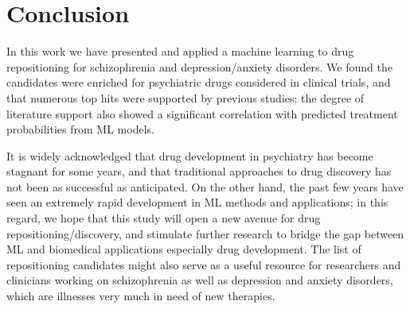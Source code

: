 \section{Conclusion}
  In this work we have presented and applied a machine learning to drug repositioning for schizophrenia and depression/anxiety disorders. We found the candidates were enriched for psychiatric drugs considered in clinical trials, and that numerous top hits were supported by previous studies; the degree of literature support also showed a significant correlation with predicted treatment probabilities from ML models. 

  It is widely acknowledged that drug development in psychiatry has become stagnant for some years, and that traditional approaches to drug discovery has not been as successful as anticipated. On the other hand, the past few years have seen an extremely rapid development in ML methods and applications; in this regard, we hope that this study will open a new avenue for drug repositioning/discovery, and stimulate further research to bridge the gap between ML and biomedical applications especially drug development. The list of repositioning candidates might also serve as a useful resource for researchers and clinicians working on schizophrenia as well as depression and anxiety disorders, which are illnesses very much in need of new therapies.
\chapterend